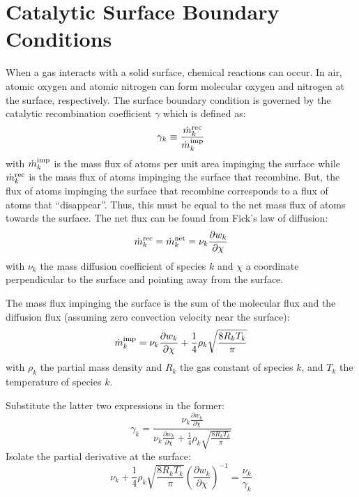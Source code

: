 \documentclass{warpdoc}
\begin{document}
\section{Catalytic Surface Boundary Conditions}

When a gas interacts with a solid surface, chemical reactions can occur. In air, atomic oxygen and atomic nitrogen can form molecular oxygen and nitrogen at the surface, respectively. The surface boundary condition is governed by the catalytic recombination coefficient $\gamma$ which is defined as:
%
\begin{equation}
\gamma_k \equiv \frac{\dot{m}^{\rm rec}_k}{\dot{m}^{\rm imp}_k}
\end{equation}
%
with $\dot{m}^{\rm imp}_k$ is the mass flux of atoms per unit area impinging the surface while $\dot{m}^{\rm rec}_k$ is the mass flux of atoms impinging the surface that recombine. But, the flux of atoms impinging the surface that recombine corresponds to a flux of atoms that ``disappear''. Thus, this must be equal to the net mass flux of atoms towards the surface. The net flux can be found from Fick's law of diffusion:
%
\begin{equation}
\dot{m}^{\rm rec}_k=\dot{m}^{\rm net}_k = \nu_k \frac{\partial w_k}{\partial \chi}
\end{equation}
%
with $\nu_k$ the mass diffusion coefficient of species $k$ and $\chi$ a coordinate perpendicular to the surface and pointing away from the surface.

The mass flux impinging the surface is the sum of the molecular flux and the diffusion flux (assuming zero convection velocity near the surface):
%
\begin{equation}
  \dot{m}^{\rm imp}_k = \nu_k \frac{\partial w_k}{\partial \chi} + \frac{1}{4} \rho_k \sqrt{\frac{8 R_k T_k}{\pi}}
\end{equation}
%
with $\rho_k$ the partial mass density and $R_k$ the gas constant of species $k$, and $T_k$ the temperature of species $k$.

Substitute the latter two expressions in the former:
%
\begin{equation}
\gamma_k = \frac{\nu_k \frac{\partial w_k}{\partial \chi}}{\nu_k \frac{\partial w_k}{\partial \chi} + \frac{1}{4} \rho_k \sqrt{\frac{8 R_k T_k}{\pi}}}
\end{equation}
%
Isolate the partial derivative at the surface:
%
\begin{equation}
\nu_k  + \frac{1}{4} \rho_k \sqrt{\frac{8 R_k T_k}{\pi}} \left( \frac{\partial w_k}{\partial \chi} \right)^{-1} = \frac{\nu_k }{\gamma_k}
\end{equation}
%
\end{document}
